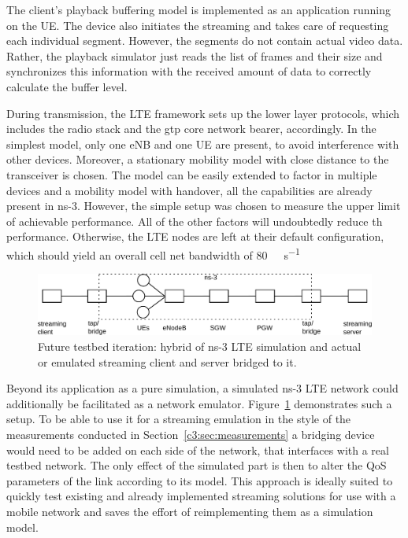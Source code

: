 The client's playback buffering model is implemented as an application running on the \gls{UE}. The device also initiates the streaming and takes care of requesting each individual segment. However, the segments do not contain actual video data. Rather, the playback simulator just reads the list of frames and their size and synchronizes this information with the received amount of data to correctly calculate the buffer level.

During transmission, the \gls{LTE} framework sets up the lower layer protocols, which includes the radio stack and the \gls{gtp} core network bearer, accordingly. In the simplest model, only one \gls{eNB} and one \gls{UE} are present, to avoid interference with other devices. Moreover, a stationary mobility model with close distance to the transceiver is chosen. The model can be easily extended to factor in multiple devices and a mobility model with handover, all the capabilities are already present in ns-3. However, the simple setup was chosen to measure the upper limit of achievable performance. All of the other factors will undoubtedly reduce th performance. Otherwise, the \gls{LTE} nodes are left at their default configuration, which should yield an overall cell net bandwidth of \SI{80}{\mega\bit\per\second}

\begin{figure}[htb]
\centering
\includegraphics[width=\textwidth]{images/streaming-hybrid.pdf}
\caption{Future testbed iteration: hybrid of ns-3 LTE simulation and actual or emulated streaming client and server bridged to it.}
\label{c6:fig:streaming-hybrid}
\end{figure}

Beyond its application as a pure simulation, a simulated ns-3 \gls{LTE} network could additionally be facilitated as a network emulator. Figure~\ref{c6:fig:streaming-hybrid} demonstrates such a setup. To be able to use it for a streaming emulation in the style of the measurements conducted in Section~\ref{c3:sec:measurements} a bridging device would need to be added on each side of the network, that interfaces with a real testbed network. The only effect of the simulated part is then to alter the \gls{QoS} parameters of the link according to its model. This approach is ideally suited to quickly test existing and already implemented streaming solutions for use with a mobile network and saves the effort of reimplementing them as a simulation model.


